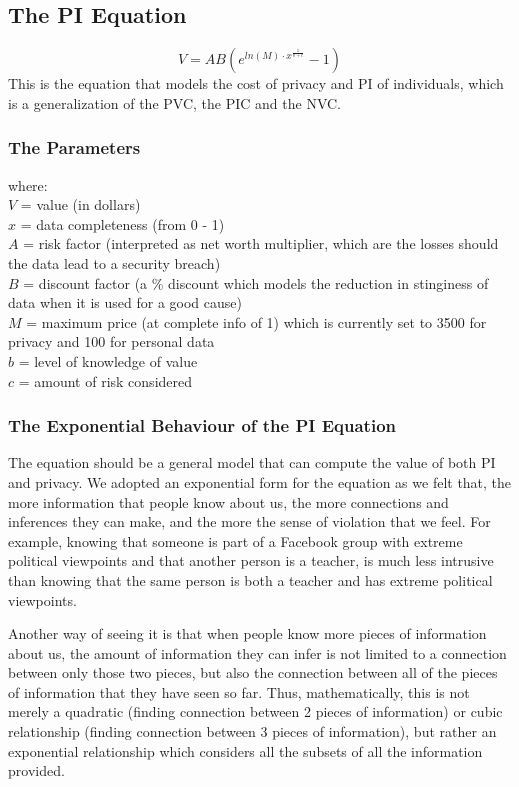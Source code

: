 \documentclass{icmmcm}
\begin{document}
\subsection{The PI Equation}
$$ V =AB(e^{ln(M) \cdot x^{\frac{1}{b+c}}}-1)$$
This is the equation that models the cost of privacy and PI of individuals, which is a generalization of the PVC, the PIC and the NVC.
\subsubsection*{The Parameters} where:\\
$V$ = value (in dollars) \\
$x$ = data completeness (from 0 - 1) \\
$A$ = risk factor (interpreted as net worth multiplier, which are the losses should the data lead to a security breach) \\
$B$ = discount factor (a \% discount which models the reduction in stinginess of data when it is used for a good cause) \\
$M$ = maximum price (at complete info of 1) which is currently set to 3500 for privacy and 100 for personal data \\
$b$ = level of knowledge of value \\
$c$ = amount of risk considered

\subsubsection{The Exponential Behaviour of the PI Equation}
The equation should be a general model that can compute the value of both PI and privacy. We adopted an exponential form for the equation as we felt that, the more information that people know about us, the more connections and inferences they can make, and the more the sense of violation that we feel. For example, knowing that someone is part of a Facebook group with extreme political viewpoints and that another person is a teacher, is much less intrusive than knowing that the same person is both a teacher and has extreme political viewpoints.

Another way of seeing it is that when people know more pieces of information about us, the amount of information they can infer is not limited to a connection between only those two pieces, but also the connection between all of the pieces of information that they have seen so far. Thus, mathematically, this is not merely a quadratic (finding connection between 2 pieces of information) or cubic relationship (finding connection between 3 pieces of information), but rather an exponential relationship which considers all the subsets of all the information provided.
\end{document}
